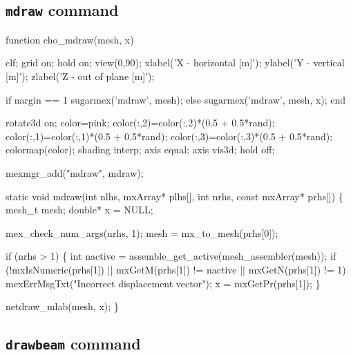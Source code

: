 \subsection{{\tt{}mdraw} command}

\nwenddocs{}\endmoddef
function cho_mdraw(mesh, x)

clf;
grid on;
hold on;
view(0,90);
xlabel('X - horizontal  [m]');
ylabel('Y - vertical  [m]');
zlabel('Z - out of plane  [m]');

if nargin == 1
    sugarmex('mdraw', mesh);
else
    sugarmex('mdraw', mesh, x);
end    

rotate3d on;
color=pink;
color(:,2)=color(:,2)*(0.5 + 0.5*rand);
color(:,1)=color(:,1)*(0.5 + 0.5*rand);
color(:,3)=color(:,3)*(0.5 + 0.5*rand);
colormap(color);
shading interp;
axis equal;
axis vis3d;
hold off;

\nwendcode{}\nwdocspar

\nwenddocs{}\plusendmoddef
mexmgr_add("mdraw", mdraw);
\nwendcode{}\nwdocspar

\nwenddocs{}\plusendmoddef
static void mdraw(int nlhs, mxArray* plhs[],
                  int nrhs, const mxArray* prhs[])
\{
    mesh_t  mesh;
    double* x = NULL;

    mex_check_num_args(nrhs, 1);
    mesh = mx_to_mesh(prhs[0]);

    if (nrhs > 1) \{
        int nactive = assemble_get_active(mesh_assembler(mesh));
        if (!mxIsNumeric(prhs[1]) || 
                mxGetM(prhs[1]) != nactive || mxGetN(prhs[1]) != 1)
            mexErrMsgTxt("Incorrect displacement vector");
        x = mxGetPr(prhs[1]);
    \}

    netdraw_mlab(mesh, x);
\}

\nwendcode{}\nwdocspar


\subsection{{\tt{}draw{}beam} command}

